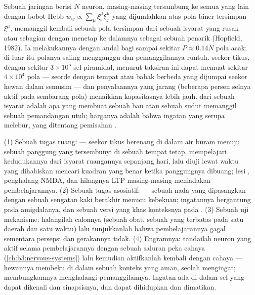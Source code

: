 \begin{proposition}\label{prop:b3:learning-memory:capacity}
Sebuah jaringan berisi $N$ neuron, masing-masing tersambung ke semua yang lain dengan
bobot Hebb $w_{ij} \propto \sum_{\mu}\xi_{i}^{\mu}\xi_{j}^{\mu}$
yang dijumlahkan atas pola biner tersimpan $\xi^{\mu}$, memanggil kembali sebuah pola
tersimpan dari sebuah isyarat yang rusak atau sebagian dengan menetap ke dalamnya sebagai sebuah
penarik (Hopfield, 1982). Ia melakukannya dengan andal bagi sampai sekitar $P
\approx 0.14N$ pola acak; di luar itu polanya saling mengganggu dan
pemanggilannya runtuh.  seekor tikus, dengan sekitar $3\times 10^{5}$ sel
piramidal, menurut taksiran ini dapat memuat sekitar $4\times 10^{4}$ pola ---
seorde dengan tempat atau babak berbeda yang dijumpai seekor hewan dalam
semusim --- dan penyalaannya yang jarang (beberapa persen selnya aktif pada sembarang
pola) menaikkan kapasitasnya lebih jauh.  dari sebuah isyarat adalah
apa yang membuat sebuah bau atau sebuah sudut memanggil sebuah pemandangan utuh; harganya adalah bahwa
ingatan yang serupa melebur, yang ditentang pemisahan .
\end{proposition}
\admitted

\begin{method}\label{met:b3:learning-memory:tests}
(1) Sebuah tugas ruang:  --- seekor tikus berenang di dalam air
buram menuju sebuah panggung yang tersembunyi di sebuah tempat tetap, mempelajari kedudukannya dari
isyarat ruangannya sepanjang hari, lalu diuji lewat waktu yang dihabiskan mencari
kuadran yang benar ketika panggungnya dibuang; lesi ,
penghalang NMDA, dan hilangnya LTP masing-masing meniadakan pembelajarannya. (2) Sebuah
tugas asosiatif:  --- sebuah nada yang dipasangkan dengan sebuah sengatan kaki
berakhir memicu kebekuan; ingatannya bergantung pada amigdalanya, dan sebuah
versi yang khas konteksnya pada . (3) Sebuah uji mekanisme:
halangilah calonnya (sebuah obat, sebuah  yang terbatas pada satu daerah dan
satu waktu) lalu tunjukkanlah bahwa pembelajarannya gagal sementara persepsi dan gerakannya tidak.
(4) Engramnya: tandailah neuron yang aktif selama pembelajarannya dengan sebuah
saluran peka cahaya (\cref{ch:b3:nervous-systems}) lalu kemudian
aktifkanlah kembali dengan cahaya --- hewannya membeku di dalam sebuah konteks yang aman, seolah
mengingat; membungkamnya menghalangi pemanggilannya. Ingatan ada di dalam sel yang
dapat dikenali dan sinapsisnya, dan dapat dihidupkan dan dimatikan.
\end{method}

